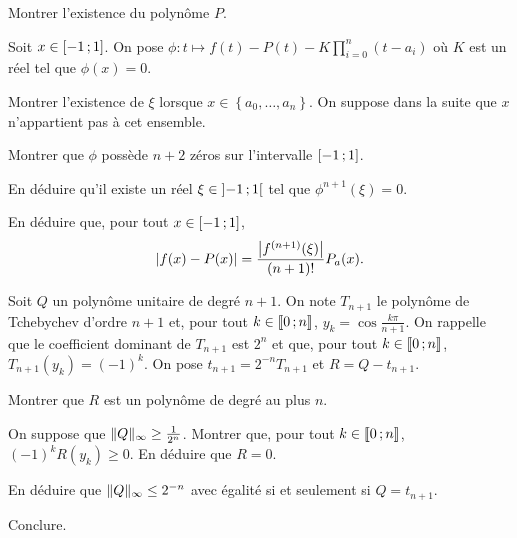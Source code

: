 \begin{exercice}
\begin{questions}
\item Montrer l'existence du polynôme $P$.
\end{questions}

Soit $x \in \left[-1\,;1\right]$. On pose $\phi : t \mapsto f(t) - P(t) - K \prod_{i=0}^n (t - a_i)$ où $K$ est un réel tel que $\phi(x) = 0$.

\begin{questions}[resume]
\item Montrer l'existence de $\xi$ lorsque $x \in \left\{a_0,\ldots,a_n\right\}$. On suppose dans la suite que $x$ n'appartient pas à cet ensemble.

\item Montrer que $\phi$ possède $n + 2$ zéros sur l'intervalle $\left[-1\,;1\right]$.

\item En déduire qu'il existe un réel $\xi \in \left]-1\,;1\right[$ tel que $\phi^{n+1}(\xi) = 0$.

\item En déduire que, pour tout $x \in \left[-1\,;1\right]$,
\[
\left| f(x) - P(x) \right| = \frac{\left| f^{(n+1)}(\xi) \right|}{(n+1)!} P_a(x).
\]
\end{questions}

Soit $Q$ un polynôme unitaire de degré $n+1$. On note $T_{n+1}$ le polynôme de Tchebychev d'ordre $n + 1$ et, pour tout $k \in \llbracket 0\,; n \rrbracket$, $y_k = \cos \frac{k\pi}{n+1}$. On rappelle que le coefficient dominant de $T_{n+1}$ est $2^n$ et que, pour tout $k \in \llbracket 0\,; n \rrbracket$, $T_{n+1}(y_k) = (-1)^k$. On pose $t_{n+1} = 2^{-n} T_{n+1}$ et $R = Q - t_{n+1}$.
\begin{questions}[resume]
\item Montrer que $R$ est un polynôme de degré au plus $n$.

\item On suppose que $\Vert Q \Vert_\infty \geq \frac{1}{2^n}$. Montrer que, pour tout $k \in \llbracket 0\,; n \rrbracket$, $(-1)^k R(y_k) \geq 0$. En déduire que $R = 0$.

\item En déduire que $\Vert Q \Vert_\infty \leq 2^{-n}$ avec égalité si et seulement si $Q = t_{n+1}$.

\item Conclure.
\end{questions}
\end{exercice}


